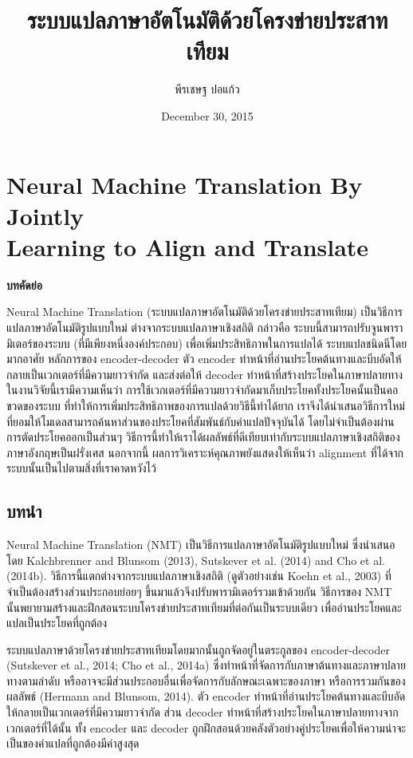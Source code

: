 \documentclass[17pt,fancychapters]{report}
\title{ระบบแปลภาษาอัตโนมัติด้วยโครงข่ายประสาทเทียม}
\author{พีรเชษฐ  ปอแก้ว}
\date{December 30, 2015}
\begin{document}
\maketitle
{}
\newpage
{}
\tableofcontents
\newpage
{}

\chapter{Neural Machine Translation By Jointly \\ Learning to Align and Translate}

\textbf{บทคัดย่อ}

Neural Machine Translation (ระบบแปลภาษาอัตโนมัติด้วยโครงข่ายประสาทเทียม) เป็นวิธีการแปลภาษาอัตโนมัติรูปแบบใหม่ ต่างจากระบบแปลภาษาเชิงสถิติ กล่าวคือ ระบบนี้สามารถปรับจูนพารามิเตอร์ของระบบ (ที่มีเพียงหนึ่งองค์ประกอบ) เพื่อเพิ่มประสิทธิภาพในการแปลได้ ระบบแปลชนิดนีโดยมากอาศัย หลักการของ encoder-decoder ตัว encoder ทำหน้าที่อ่านประโยคต้นทางและบีบอัดให้กลายเป็นเวกเตอร์ที่มีความยาวจำกัด และส่งต่อให้ decoder ทำหน้าที่สร้างประโยคในภาษาปลายทาง ในงานวิจัยนี้เรามีความเห็นว่า การใช้เวกเตอร์ที่มีความยาวจำกัดมาเก็บประโยคทั้งประโยคนั้นเป็นคอขวดของระบบ ที่ทำให้การเพิ่มประสิทธิภาพของการแปลด้วยวิธีนี้ทำได้ยาก เราจึงได้นำเสนอวิธีการใหม่ที่ยอมให้โมเดลสามารถค้นหาส่วนของประโยคที่สัมพันธ์กับคำแปลปัจจุบันได้ โดยไม่จำเป็นต้องผ่านการตัดประโยคออกเป็นส่วนๆ วิธีการนี้ทำให้เราได้ผลลัพธ์ที่ดีเทียบเท่ากับระบบแปลภาษาเชิงสถิติของภาษาอังกฤษเป็นฝรั่งเศส นอกจากนี้ ผลการวิเคราะห์คุณภาพยังแสดงให้เห็นว่า alignment ที่ได้จากระบบนั้นเป็นไปตามสิ่งที่เราคาดหวังไว้ 


\section{บทนำ}
Neural Machine Translation (NMT) เป็นวิธีการแปลภาษาอัตโนมัติรูปแบบใหม่ ซึ่งนำเสนอโดย Kalchbrenner and Blunsom (2013), Sutskever et al. (2014) and Cho et al. (2014b). วิธีการนี้แตกต่างจากระบบแปลภาษาเชิงสถิติ (ดูตัวอย่างเช่น Koehn et al., 2003) ที่จำเป็นต้องสร้างส่วนประกอบย่อยๆ ขึ้นมาแล้วจึงปรับพารามิเตอร์รวมเข้าด้วยกัน วิธีการของ NMT นั้นพยายามสร้างและฝึกสอนระบบโครงข่ายประสาทเทียมที่ต่อกันเป็นระบบเดียว เพื่ออ่านประโยคและแปลเป็นประโยคที่ถูกต้อง

ระบบแปลภาษาด้วยโครงข่ายประสาทเทียมโดยมากนั้นถูกจัดอยู่ในตระกูลของ encoder-decoder  (Sutskever et al., 2014; Cho et al., 2014a) ซึ่งทำหน้าที่จัดการกับภาษาต้นทางและภาษาปลายทางตามลำดับ หรืออาจจะมีส่วนประกอบอื่นเพื่อจัดการกับลักษณะเฉพาะของภาษา หรือการรวมกันของผลลัพธ์ (Hermann and Blunsom, 2014). ตัว encoder ทำหน้าที่อ่านประโยคต้นทางและบีบอัดให้กลายเป็นเวกเตอร์ที่มีความยาวจำกัด ส่วน decoder ทำหน้าที่สร้างประโยคในภาษาปลายทางจากเวกเตอร์ที่ได้นั้น ทั้ง encoder และ decoder ถูกฝึกสอนด้วยคลังตัวอย่างคู่ประโยคเพื่อให้ความน่าจะเป็นของคำแปลที่ถูกต้องมีค่าสูงสุด
\end{document}
